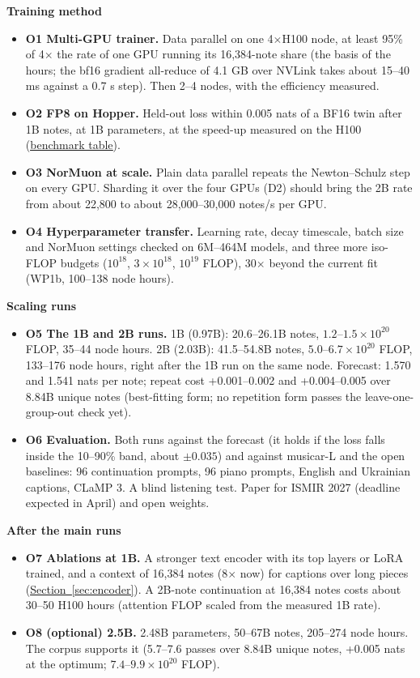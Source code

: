 \documentclass[11pt,a4paper]{article}
\newcommand{\seclink}[2]{\hyperref[#1]{\textcolor{blue!60!black}{\underline{#2}}}}
\begin{document}
\textbf{Training method}
\begin{itemize}
\item \textbf{O1 Multi-GPU trainer.} Data parallel on one 4$\times$H100 node, at least 95\% of 4$\times$ the
rate of one GPU running its 16,384-note share (the basis of the hours; the bf16 gradient all-reduce of 4.1 GB over
NVLink takes about 15--40 ms against a 0.7 s step). Then 2--4
nodes, with the efficiency measured.
\item \textbf{O2 FP8 on Hopper.} Held-out loss within 0.005 nats of a BF16 twin after 1B notes, at 1B parameters,
at the speed-up measured on the H100 (\seclink{sec:scal}{benchmark table}).
\item \textbf{O3 NorMuon at scale.} Plain data parallel repeats the Newton--Schulz step on every GPU. Sharding it over
the four GPUs (D2) should bring the 2B rate from about 22,800 to about 28,000--30,000 notes/s per GPU.
\item \textbf{O4 Hyperparameter transfer.} Learning rate, decay timescale, batch size and NorMuon settings checked on
6M--464M models, and three more iso-FLOP budgets ($10^{18}$, $3\times10^{18}$, $10^{19}$ FLOP), 30$\times$ beyond the
current fit (WP1b, 100--138 node hours).
\end{itemize}

\medskip
\textbf{Scaling runs}
\begin{itemize}
\item \textbf{O5 The 1B and 2B runs.} 1B (0.97B): 20.6--26.1B notes, $1.2$--$1.5\times10^{20}$ FLOP, 35--44 node hours.
2B (2.03B): 41.5--54.8B notes, $5.0$--$6.7\times10^{20}$ FLOP, 133--176 node hours, right after the 1B run on the
same node. Forecast: 1.570 and 1.541 nats per note; repeat cost +0.001--0.002 and +0.004--0.005 over 8.84B unique notes
(best-fitting form; no repetition form passes the leave-one-group-out check yet).
\item \textbf{O6 Evaluation.} Both runs against the forecast (it holds if the loss falls inside the 10--90\% band,
about $\pm0.035$) and against musicar-L and the open baselines: 96 continuation prompts, 96 piano prompts, English and
Ukrainian captions, CLaMP 3. A blind listening test. Paper for ISMIR 2027
(deadline expected in April) and open weights.
\end{itemize}

\medskip
\textbf{After the main runs}
\begin{itemize}
\item \textbf{O7 Ablations at 1B.} A stronger text encoder with its top layers or LoRA trained, and a context of
16,384 notes (8$\times$ now) for captions over long pieces
(\seclink{sec:encoder}{Section~\ref*{sec:encoder}}). A 2B-note continuation at 16,384 notes costs about 30--50 H100
hours (attention FLOP scaled from the measured 1B rate).
\item \textbf{O8 (optional) 2.5B.} 2.48B parameters, 50--67B notes, 205--274 node hours. The corpus supports it
(5.7--7.6 passes over 8.84B unique notes, +0.005 nats at the optimum; $7.4$--$9.9\times10^{20}$ FLOP).
\end{itemize}
\end{document}
